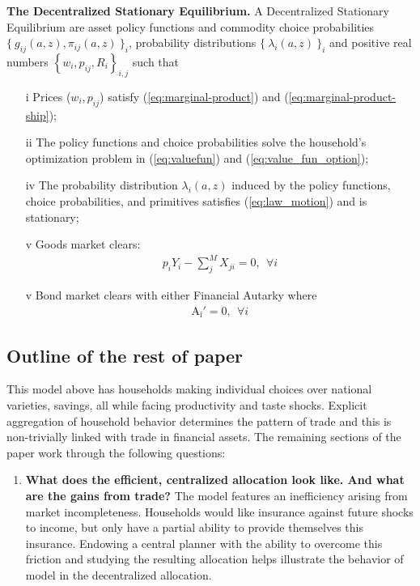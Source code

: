 \documentclass[12pt,pdftex]{article}
\begin{document}
\begin{onehalfspacing}
\textbf{The Decentralized Stationary Equilibrium.} A Decentralized Stationary Equilibrium are asset policy functions and commodity choice probabilities $\{\  g_{ij}(a, z), \pi_{ij}(a, z) \ \}_{i}$, probability distributions $\{ \ \lambda_i(a, z) \ \}_{i}$ and positive real numbers $\left \{w_i, p_{ij}, R_i\right \}_{i,j}$ such that
\begin{itemize}
\vspace{-.4cm}
\item[i]  Prices ($w_i, p_{ij}$) satisfy (\ref{eq:marginal-product}) and (\ref{eq:marginal-product-ship});
\item[ii] The policy functions and choice probabilities solve the household's optimization problem in (\ref{eq:valuefun}) and (\ref{eq:value_fun_option});
\item[iv] The probability distribution $\lambda_i(a, z)$ induced by the policy functions, choice probabilities, and primitives satisfies (\ref{eq:law_motion}) and is stationary;
\item[v] Goods market clears:
\begin{align}
p_{i} Y_{i} - \sum_{j}^{M}  X_{ji} = 0, \ \ \forall i
\end{align}
\item[v] Bond market clears with either Financial Autarky where
\begin{align}
\mathrm{A_i'} = 0, \ \ \forall i
\label{eq:fa-condition}
\end{align}
\end{itemize}

\subsection{Outline of the rest of paper}

This model above has households making individual choices over national varieties, savings, all while facing productivity and taste shocks. Explicit aggregation of household behavior determines the pattern of trade and this is non-trivially linked with trade in financial assets.  The remaining sections of the paper work through the following questions:
\begin{enumerate}
\item \textbf{What does the efficient, centralized allocation look like. And what are the gains from trade?} The model features an inefficiency arising from market incompleteness. Households would like insurance against future shocks to income, but only have a partial ability to provide themselves this insurance. Endowing a central planner with the ability to overcome this friction and studying the resulting allocation helps illustrate the behavior of model in the decentralized allocation.
    

\end{enumerate}
\end{onehalfspacing}
\end{document}
